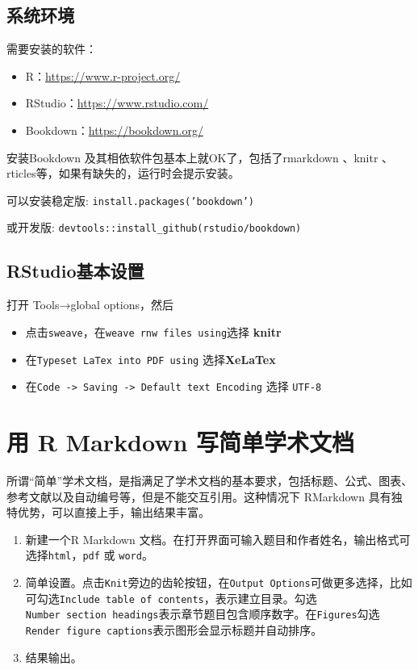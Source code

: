 \documentclass[]{article}
\begin{document}
\subsection{系统环境}

需要安装的软件：

\begin{itemize}
\item
  R：\url{https://www.r-project.org/}
\item
  RStudio：\url{https://www.rstudio.com/}
\item
  Bookdown：\url{https://bookdown.org/}
\end{itemize}

安装Bookdown
\citep{R-bookdown}及其相依软件包基本上就OK了，包括了rmarkdown
\citep{R-rmarkdown}、knitr \citep{R-knitr}、
rticles等，如果有缺失的，运行时会提示安装。

可以安装稳定版: \texttt{install.packages(’bookdown’)}

或开发版:
\texttt{devtools::install\_github(\textquotesingle{}rstudio/bookdown\textquotesingle{})}

\hypertarget{rstudio}{%
\subsection{RStudio基本设置}\label{rstudio}}

打开 Tools→global options，然后

\begin{itemize}
\item
  点击\texttt{sweave}，在\texttt{weave\ rnw\ files\ using}选择
  \textbf{knitr}
\item
  在\texttt{Typeset\ LaTex\ into\ PDF\ using} 选择\textbf{XeLaTex}
\item
  在\texttt{Code\ -\textgreater{}\ Saving\ -\textgreater{}\ Default\ text\ Encoding}
  选择 \texttt{UTF-8}
\end{itemize}

\hypertarget{-r-markdown-}{%
\section{用 R Markdown 写简单学术文档}\label{-r-markdown-}}

所谓``简单''学术文档，是指满足了学术文档的基本要求，包括标题、公式、图表、参考文献以及自动编号等，但是不能交互引用。这种情况下
RMarkdown 具有独特优势，可以直接上手，输出结果丰富。

\begin{enumerate}
\def\labelenumi{\arabic{enumi}.}
\item
  新建一个R Markdown
  文档。在打开界面可输入题目和作者姓名，输出格式可选择\texttt{html}，\texttt{pdf}
  或 \texttt{word}。
\item
  简单设置。点击\texttt{Knit}旁边的齿轮按钮，在\texttt{Output\ Options}可做更多选择，比如可勾选\texttt{Include\ table\ of\ contents}，表示建立目录。勾选\texttt{Number\ section\ headings}表示章节题目包含顺序数字。在\texttt{Figures}勾选\texttt{Render\ figure\ captions}表示图形会显示标题并自动排序。
\item
  结果输出。
\end{enumerate}
\end{document}
